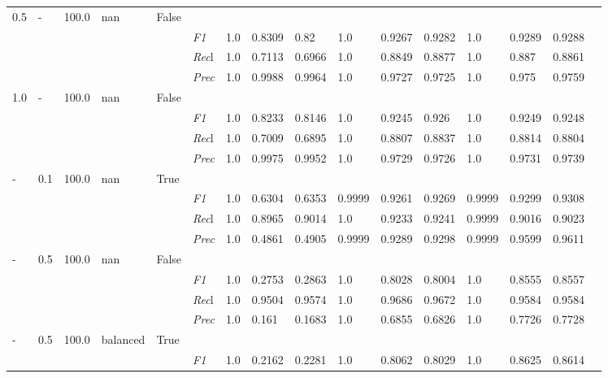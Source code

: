 \begin{table}[]
\begin{tabularx}{\textwidth}{XXXXX|X|XXX|XXX|XXXX}
    0.5 & - & 100.0 & nan & False& & & & & & & & & \\
    & & & & & \textit{F1} & 1.0 & 0.8309 & 0.82 & 1.0 & 0.9267        & 0.9282        & 1.0        & 0.9289        & 0.9288        \\
    & & & & & \textit{Rec}l & 1.0 & 0.7113 & 0.6966    & 1.0 & 0.8849    & 0.8877    & 1.0    & 0.887    & 0.8861    \\
    & & & & & \textit{Prec} & 1.0 & 0.9988 & 0.9964 & 1.0 & 0.9727 & 0.9725 & 1.0 & 0.975 & 0.9759 \\ \midrule
    1.0 & - & 100.0 & nan & False& & & & & & & & & \\
    & & & & & \textit{F1} & 1.0 & 0.8233 & 0.8146 & 1.0 & 0.9245        & 0.926        & 1.0        & 0.9249        & 0.9248        \\
    & & & & & \textit{Rec}l & 1.0 & 0.7009 & 0.6895    & 1.0 & 0.8807    & 0.8837    & 1.0    & 0.8814    & 0.8804    \\
    & & & & & \textit{Prec} & 1.0 & 0.9975 & 0.9952 & 1.0 & 0.9729 & 0.9726 & 1.0 & 0.9731 & 0.9739 \\ \midrule
    - & 0.1 & 100.0 & nan & True& & & & & & & & & \\
    & & & & & \textit{F1} & 1.0 & 0.6304 & 0.6353 & 0.9999 & 0.9261        & 0.9269        & 0.9999        & 0.9299        & 0.9308        \\
    & & & & & \textit{Rec}l & 1.0 & 0.8965 & 0.9014    & 1.0 & 0.9233    & 0.9241    & 0.9999    & 0.9016    & 0.9023    \\
    & & & & & \textit{Prec} & 1.0 & 0.4861 & 0.4905 & 0.9999 & 0.9289 & 0.9298 & 0.9999 & 0.9599 & 0.9611 \\ \midrule
    - & 0.5 & 100.0 & nan & False& & & & & & & & & \\
    & & & & & \textit{F1} & 1.0 & 0.2753 & 0.2863 & 1.0 & 0.8028        & 0.8004        & 1.0        & 0.8555        & 0.8557        \\
    & & & & & \textit{Rec}l & 1.0 & 0.9504 & 0.9574    & 1.0 & 0.9686    & 0.9672    & 1.0    & 0.9584    & 0.9584    \\
    & & & & & \textit{Prec} & 1.0 & 0.161 & 0.1683 & 1.0 & 0.6855 & 0.6826 & 1.0 & 0.7726 & 0.7728 \\ \midrule
    - & 0.5 & 100.0 & balanced & True& & & & & & & & & \\
    & & & & & \textit{F1} & 1.0 & 0.2162 & 0.2281 & 1.0 & 0.8062        & 0.8029        & 1.0        & 0.8625        & 0.8614        \\

\end{tabularx}
\end{table}
